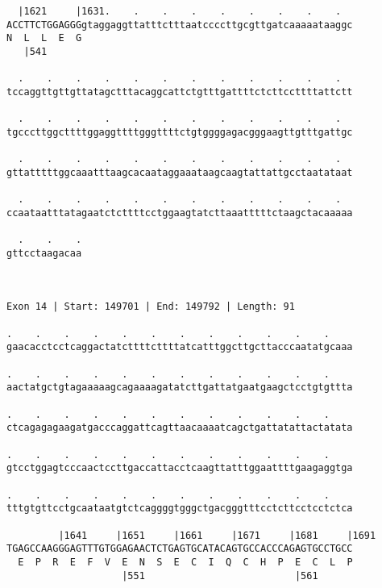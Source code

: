 \documentclass{article}
\begin{document}
\begin{Verbatim}
  |1621     |1631.    .    .    .    .    .    .    .    .  
ACCTTCTGGAGGGgtaggaggttatttctttaatccccttgcgttgatcaaaaataaggc
N  L  L  E  G                                               
   |541                                                     
  
  .    .    .    .    .    .    .    .    .    .    .    .  
tccaggttgttgttatagctttacaggcattctgtttgattttctcttccttttattctt
                                                            
  .    .    .    .    .    .    .    .    .    .    .    .  
tgcccttggcttttggaggttttgggttttctgtggggagacgggaagttgtttgattgc
                                                            
  .    .    .    .    .    .    .    .    .    .    .    .  
gttatttttggcaaatttaagcacaataggaaataagcaagtattattgcctaatataat
                                                            
  .    .    .    .    .    .    .    .    .    .    .    .  
ccaataatttatagaatctcttttcctggaagtatcttaaatttttctaagctacaaaaa
                                                            
  .    .    .
gttcctaagacaa
             
             
 
Exon 14 | Start: 149701 | End: 149792 | Length: 91
 
.    .    .    .    .    .    .    .    .    .    .    .    
gaacacctcctcaggactatcttttcttttatcatttggcttgcttacccaatatgcaaa
                                                            
.    .    .    .    .    .    .    .    .    .    .    .    
aactatgctgtagaaaaagcagaaaagatatcttgattatgaatgaagctcctgtgttta
                                                            
.    .    .    .    .    .    .    .    .    .    .    .    
ctcagagagaagatgacccaggattcagttaacaaaatcagctgattatattactatata
                                                            
.    .    .    .    .    .    .    .    .    .    .    .    
gtcctggagtcccaactccttgaccattacctcaagttatttggaattttgaagaggtga
                                                            
.    .    .    .    .    .    .    .    .    .    .    .    
tttgtgttcctgcaataatgtctcaggggtgggctgacgggtttcctcttcctcctctca
                                                            
         |1641     |1651     |1661     |1671     |1681     |1691
TGAGCCAAGGGAGTTTGTGGAGAACTCTGAGTGCATACAGTGCCACCCAGAGTGCCTGCC
  E  P  R  E  F  V  E  N  S  E  C  I  Q  C  H  P  E  C  L  P
                    |551                          |561      
  

\end{Verbatim}
\end{document}
